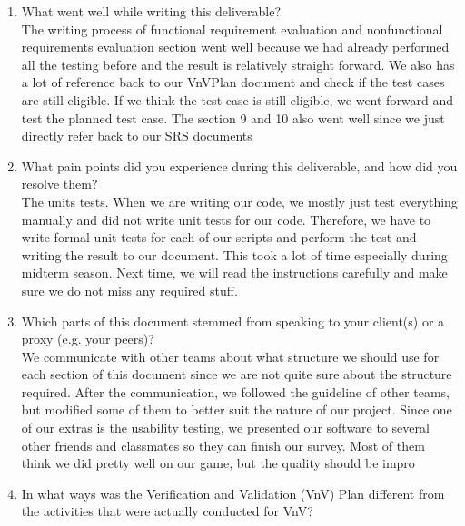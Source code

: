 \documentclass[12pt, titlepage]{article}
\begin{document}
\begin{enumerate}
  \item What went well while writing this deliverable?\\
  The writing process of functional requirement evaluation and nonfunctional requirements evaluation section went well because we had already performed all the testing before and the result is relatively straight forward. We also has a lot of reference back to our VnVPlan document and check if the test cases are still eligible. If we think the test case is still eligible, we went forward and test the planned test case. The section 9 and 10 also went well since we just directly refer back to our SRS documents
  \item What pain points did you experience during this deliverable, and how did you resolve them?\\
  The units tests. When we are writing our code, we mostly just test everything manually and did not write unit tests for our code. Therefore, we have to write formal unit tests for each of our scripts and perform the test and writing the result to our document. This took a lot of time especially during midterm season. Next time, we will read the instructions carefully and make sure we do not miss any required stuff.
  \item Which parts of this document stemmed from speaking to your client(s) or a proxy (e.g. your peers)?\\
  We communicate with other teams about what structure we should use for each section of this document since we are not quite sure about the structure required. After the communication, we followed the guideline of other teams, but modified some of them to better suit the nature of our project. Since one of our extras is the usability testing, we presented our software to several other friends and classmates so they can finish our survey. Most of them think we did pretty well on our game, but the quality should be impro
  \item In what ways was the Verification and Validation (VnV) Plan different from the activities that were actually conducted for VnV?
\end{enumerate}
\end{document}

